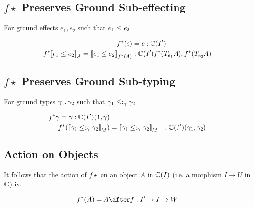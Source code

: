{\subsection{$f\star$ Preserves Ground Sub-effecting}
For ground effects $e_1, e_2$ such that $e_1\leq e_2$



\begin{align}
    f^*(e) & = e: \mathbb{C}(I')\\
    f^*{\bf [\![}\epsilon_1\leq e_2{\bf ]\!]}_A = {\bf [\![}e_1 \leq e_2{\bf ]\!]}_{f^*(A)} &:\mathbb{C}(I'){f^*(T_{e_1}{A}), f^*(T_{e_2}{A})} \\
\end{align}
\subsection{$f\star$ Preserves Ground Sub-typing}
For ground types $\gamma_1, \gamma_2$ such that $\gamma_1\leq:_\gamma\gamma_2$

\begin{align}
    f^*{\gamma} = \gamma: \mathbb{C}(I')(\texttt{1}, \gamma)\\
    f^*({\bf [\![}\gamma_1 \leq:_\gamma \gamma_2{\bf ]\!]}_M) & = {\bf [\![}\gamma_1 \leq:_\gamma \gamma_2{\bf ]\!]}_M &: \mathbb{C}(I')(\gamma_1, \gamma_2)\\
\end{align}

\subsection{Action on Objects}

It follows that the action of $f\star$ on an object $A$ in $\mathbb{C}(I)$ (i.e. a morphism $I \rightarrow U$ in $\mathbb{C}$) is:

\begin{equation}
    f\star(A) = A\after f: I'\rightarrow I\rightarrow W
\end{equation}
}




